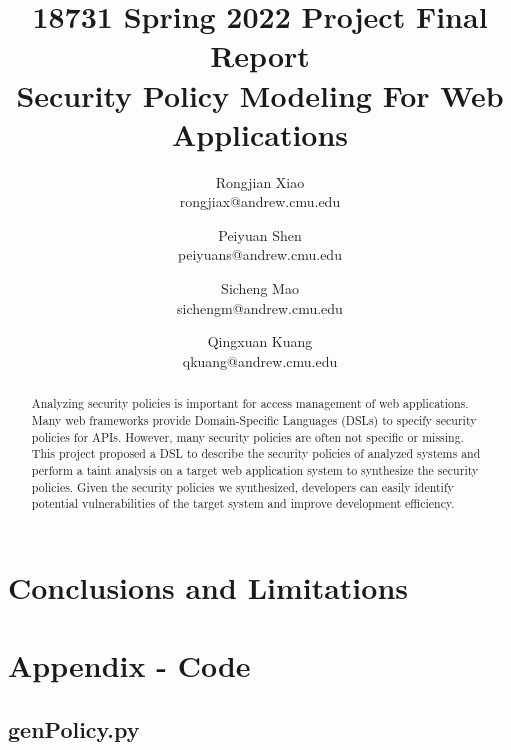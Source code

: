 \documentclass[twocolumn,10pt]{article}
\begin{document}
\title{18731 Spring 2022 Project Final Report\\
  Security Policy Modeling For Web Applications}

\author{
  Rongjian Xiao \\ rongjiax@andrew.cmu.edu \and
  Peiyuan Shen \\ peiyuans@andrew.cmu.edu \and
  Sicheng Mao \\ sichengm@andrew.cmu.edu \and
  Qingxuan Kuang \\ qkuang@andrew.cmu.edu
}

\maketitle

\begin{abstract}

  Analyzing security policies is important for access management of web
  applications.
  Many web frameworks provide Domain-Specific Languages (DSLs) to specify
  security policies for APIs.
  However, many security policies are often not specific or missing.
  This project proposed a DSL to describe the security policies of analyzed
  systems and perform a taint analysis on a target web application system to
  synthesize the security policies.
  Given the security policies we synthesized, developers can easily identify
  potential vulnerabilities of the target system and improve development
  efficiency.

\end{abstract}






\section{Conclusions and Limitations}%

 {
  \footnotesize
  \raggedright
  
  
 }

\newpage
\onecolumn
\section{Appendix - Code}

\lstset{style=mystyle}
\subsection*{\centering \large genPolicy.py}

\end{document}
